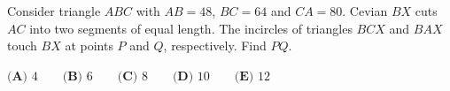 Consider triangle $ABC$ with $AB=48$, $BC=64$ and $CA=80$. Cevian $BX$ cuts $AC$ into two segments of equal length. The incircles of triangles $BCX$ and $BAX$ touch $BX$ at points $P$ and $Q$, respectively. Find $PQ$.

$\textbf{(A) }4\qquad\textbf{(B) }6\qquad\textbf{(C) }8\qquad\textbf{(D) }10\qquad\textbf{(E) }12$
